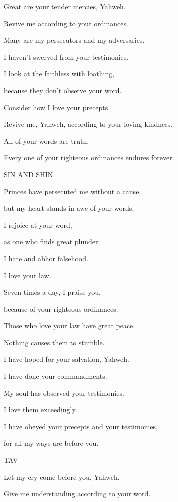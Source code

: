 {\par }{\Q {}Great are your tender mercies, Yahweh.
\par }{\QB Revive me according to your ordinances.
\par }{\Q {}Many are my persecutors and my adversaries.
\par }{\QB I haven’t swerved from your testimonies.
\par }{\Q {}I look at the faithless with loathing,
\par }{\QB because they don’t observe your word.
\par }{\Q {}Consider how I love your precepts.
\par }{\QB Revive me, Yahweh, according to your loving kindness.
\par }{\Q {}All of your words are truth.
\par }{\QB Every one of your righteous ordinances endures forever.
\par }{\D SIN AND SHIN
\par }{\Q {}Princes have persecuted me without a cause,
\par }{\QB but my heart stands in awe of your words.
\par }{\Q {}I rejoice at your word,
\par }{\QB as one who finds great plunder.
\par }{\Q {}I hate and abhor falsehood.
\par }{\QB I love your law.
\par }{\Q {}Seven times a day, I praise you,
\par }{\QB because of your righteous ordinances.
\par }{\Q {}Those who love your law have great peace.
\par }{\QB Nothing causes them to stumble.
\par }{\Q {}I have hoped for your salvation, Yahweh.
\par }{\QB I have done your commandments.
\par }{\Q {}My soul has observed your testimonies.
\par }{\QB I love them exceedingly.
\par }{\Q {}I have obeyed your precepts and your testimonies,
\par }{\QB for all my ways are before you.
\par }{\D TAV
\par }{\Q {}Let my cry come before you, Yahweh.
\par }{\QB Give me understanding according to your word.
}
